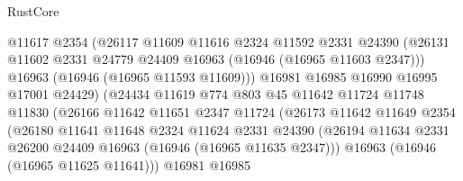 \begin{lexlean}{RustCore}
\begin{coremodule}
                                @11617
                                @2354
                                (@26117
                                  @11609
                                  @11616
                                  @2324
                                  @11592
                                  @2331
                                  @24390
                                  (@26131
                                    @11602
                                    @2331
                                    @24779
                                    @24409
                                    @16963
                                    (@16946 (@16965 @11603 @2347)))
                                  @16963
                                  (@16946 (@16965 @11593 @11609)))
                                @16981
                                @16985
                                @16990
                                @16995
                                @17001
                                @24429)
                              (@24434
                                @11619
                                @774
                                @803
                                @45
                                @11642
                                @11724
                                @11748
                                @11830
                                (@26166
                                  @11642
                                  @11651
                                  @2347
                                  @11724
                                  (@26173
                                    @11642
                                    @11649
                                    @2354
                                    (@26180
                                      @11641
                                      @11648
                                      @2324
                                      @11624
                                      @2331
                                      @24390
                                      (@26194
                                        @11634
                                        @2331
                                        @26200
                                        @24409
                                        @16963
                                        (@16946 (@16965 @11635 @2347)))
                                      @16963
                                      (@16946 (@16965 @11625 @11641)))
                                    @16981
                                    @16985

\end{coremodule}
\end{lexlean}
